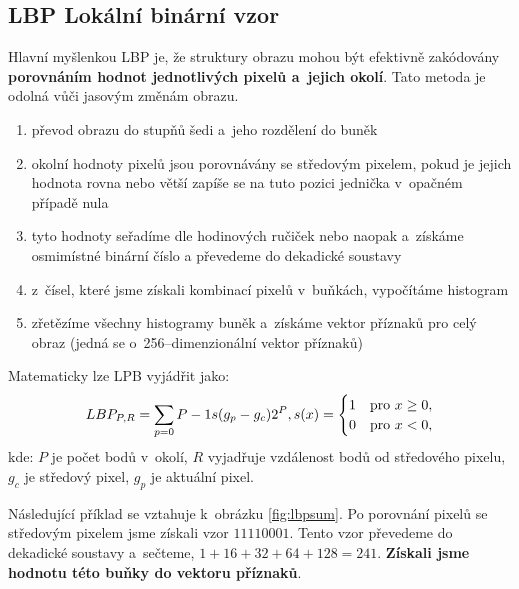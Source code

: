 \subsection{LBP Lokální binární vzor}
Hlavní myšlenkou LBP je, že struktury obrazu mohou být efektivně zakódovány \textbf{porovnáním hodnot jednotlivých pixelů a~jejich okolí}. Tato metoda je odolná vůči jasovým změnám obrazu.
\begin{enumerate}
  \item převod obrazu do stupňů šedi a~jeho rozdělení do buněk
  \item okolní hodnoty pixelů jsou porovnávány se středovým pixelem, pokud je jejich hodnota rovna nebo větší zapíše se na tuto pozici jednička v~opačném případě nula
  \item tyto hodnoty seřadíme dle hodinových ručiček nebo naopak a~získáme osmimístné binární číslo a převedeme do dekadické soustavy
  \item z~čísel, které jsme získali kombinací pixelů v~buňkách, vypočítáme histogram
  \item zřetězíme všechny histogramy buněk a~získáme vektor příznaků pro celý obraz (jedná se o~256--dimenzionální vektor příznaků)
\end{enumerate}
Matematicky lze LPB vyjádřit jako:
\begin{equation*}
LBP_{P,R} = \sum_{p=0}{P-1} s(g_p - g_c)2^P, \\
s(x) =
  \begin{cases} 
   1 & \text{pro } x \geq 0, \\
   0       & \text{pro } x < 0,
  \end{cases}
\end{equation*}
kde: $P$ je počet bodů v~okolí, $R$ vyjadřuje vzdálenost bodů od středového pixelu, $g_c$ je středový pixel, $g_p$ je aktuální pixel. 

Následující příklad se vztahuje k~obrázku \ref{fig:lbpsum}. Po porovnání pixelů se středovým pixelem jsme získali vzor $11110001$. Tento vzor převedeme do dekadické soustavy a~sečteme, $ 1+16+32+64+128 = 241$. \textbf{Získali jsme hodnotu této buňky do vektoru příznaků}.

